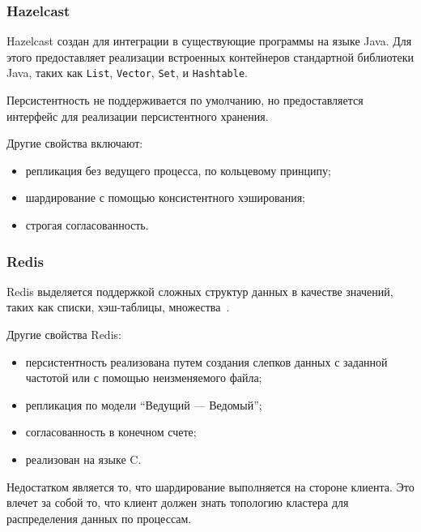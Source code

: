 \documentclass[14pt, russian]{scrartcl}
\begin{document}
\subsubsection{Hazelcast}

Hazelcast создан для интеграции в существующие программы на языке Java. Для этого
предоставляет реализации встроенных контейнеров стандартной библиотеки Java,
таких как \verb|List|, \verb|Vector|, \verb|Set|, и \verb|Hashtable|.

Персистентность не поддерживается по умолчанию, но предоставляется интерфейс для
реализации персистентного хранения.

Другие свойства включают:

\begin{itemize}
  \item репликация без ведущего процесса, по кольцевому принципу;
  \item шардирование с помощью консистентного хэширования;
  \item строгая согласованность.
\end{itemize}

\subsubsection{Redis}

Redis выделяется поддержкой сложных структур данных в качестве значений, таких
как списки, хэш-таблицы, множества~\cite{redis}.

Другие свойства Redis:

\begin{itemize}
  \item персистентность реализована путем создания слепков данных с заданной
        частотой или с помощью неизменяемого файла;
  \item репликация по модели ``Ведущий --- Ведомый'';
  \item согласованность в конечном счете;
  \item реализован на языке C.
\end{itemize}

Недостатком является то, что шардирование выполняется на стороне клиента. Это
влечет за собой то, что клиент должен знать топологию кластера для распределения
данных по процессам.

\end{document}
